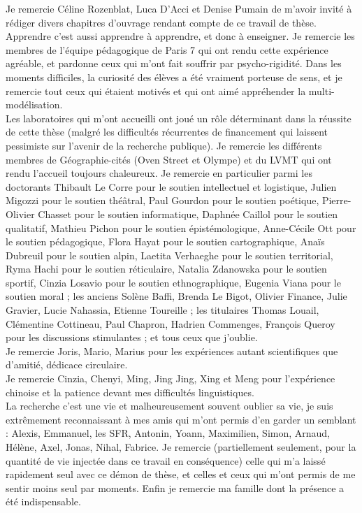 Je remercie Céline Rozenblat, Luca D'Acci et Denise Pumain de m'avoir invité à rédiger divers chapitres d'ouvrage rendant compte de ce travail de thèse.
\\



Apprendre c'est aussi apprendre à apprendre, et donc à enseigner. Je remercie les membres de l'équipe pédagogique de Paris 7 qui ont rendu cette expérience agréable, et pardonne ceux qui m'ont fait souffrir par psycho-rigidité. Dans les moments difficiles, la curiosité des élèves a été vraiment porteuse de sens, et je remercie tout ceux qui étaient motivés et qui ont aimé appréhender la multi-modélisation.\\

Les laboratoires qui m'ont accueilli ont joué un rôle déterminant dans la réussite de cette thèse (malgré les difficultés récurrentes de financement qui laissent pessimiste sur l'avenir de la recherche publique). Je remercie les différents membres de Géographie-cités (Oven Street et Olympe) et du LVMT qui ont rendu l'accueil toujours chaleureux. Je remercie en particulier parmi les doctorants Thibault Le Corre pour le soutien intellectuel et logistique, Julien Migozzi pour le soutien théâtral, Paul Gourdon pour le soutien poétique, Pierre-Olivier Chasset pour le soutien informatique, Daphnée Caillol pour le soutien qualitatif, Mathieu Pichon pour le soutien épistémologique, Anne-Cécile Ott pour le soutien pédagogique, Flora Hayat pour le soutien cartographique, Anaïs Dubreuil pour le soutien alpin, Laetita Verhaeghe pour le soutien territorial, Ryma Hachi pour le soutien réticulaire, Natalia Zdanowska pour le soutien sportif, Cinzia Losavio pour le soutien ethnographique, Eugenia Viana pour le soutien moral ; les anciens Solène Baffi, Brenda Le Bigot, Olivier Finance, Julie Gravier, Lucie Nahassia, Etienne Toureille ; les titulaires Thomas Louail, Clémentine Cottineau, Paul Chapron, Hadrien Commenges, François Queroy pour les discussions stimulantes ; et tous ceux que j'oublie.\\

Je remercie Joris, Mario, Marius pour les expériences autant scientifiques que d'amitié, dédicace circulaire.\\

Je remercie Cinzia, Chenyi, Ming, Jing Jing, Xing et Meng pour l'expérience chinoise et la patience devant mes difficultés linguistiques.\\


La recherche c'est une vie et malheureusement souvent oublier sa vie, je suis extrêmement reconnaissant à mes amis qui m'ont permis d'en garder un semblant : Alexis, Emmanuel, les SFR, Antonin, Yoann, Maximilien, Simon, Arnaud, Hélène, Axel, Jonas, Nihal, Fabrice. Je remercie (partiellement seulement, pour la quantité de vie injectée dans ce travail en conséquence) celle qui m'a laissé rapidement seul avec ce démon de thèse, et celles et ceux qui m'ont permis de me sentir moins seul par moments. Enfin je remercie ma famille dont la présence a été indispensable.


